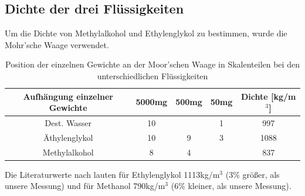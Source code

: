 \documentclass[12pt,a4paper,titlepage,headinclude,bibtotoc]{scrartcl}
\begin{document}
\subsection{Dichte der drei Flüssigkeiten}
Um die Dichte von Methylalkohol und Ethylenglykol zu bestimmen, wurde die Mohr'sche Waage verwendet.
\begin{table}
\centering
\begin{tabular}{|c|c|c|c|c|}
\hline Aufhängung einzelner Gewichte & 5000mg & 500mg & 50mg &Dichte [kg/m$^3$]\\
\hline Dest. Wasser  & 10	&	& 1	& 997	\\
\hline Äthylenglykol & 10	& 9	& 3	& 1088	\\
\hline Methylalkohol & 8	& 4	& 	& 837	\\\hline
\end{tabular}
\caption{Position der einzelnen Gewichte an der Moor'schen Waage in Skalenteilen bei den unterschiedlichen Flüssigkeiten\label{tab:dichte}}
\end{table}
Die Literaturwerte nach \cite[S. 130-131]{Formelsammlung} lauten für Ethylenglykol 1113kg/m$^3$ (3\% größer, als unsere Messung) und für Methanol 790kg/m$^3$ (6\% kleiner, als unsere Messung).
\end{document}
